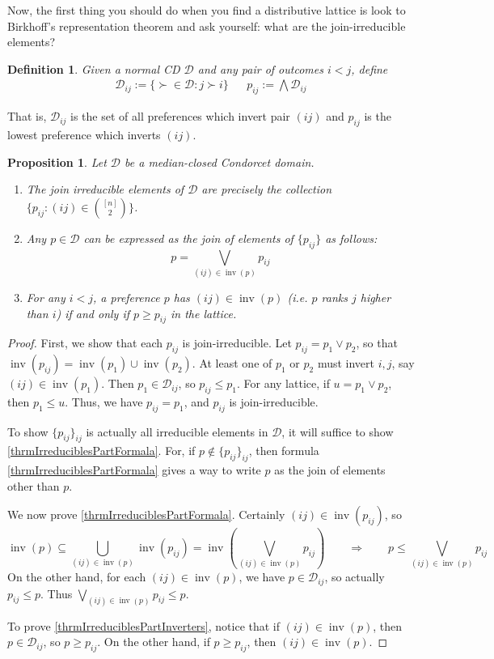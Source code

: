 \documentclass[12pt]{article}
\newtheorem{definition}[theorem]{Definition}
\newtheorem{proposition}[theorem]{Proposition}
\newcommand{\D}{\mathcal{D}}
\DeclareMathOperator*{\inv}{inv}
\newcommand{\1}[1]{\mathds{1}[{#1}]}
\begin{document}
  Now, the first thing you should do when you find a distributive lattice is 
  look to Birkhoff's representation theorem and ask yourself:
  what are the join-irreducible elements?

  \begin{definition}
    Given a normal CD $\D$ and any pair of outcomes $i<j$, define
    \begin{align*}
      \D_{ij} := \{ \succ\in\D : j\succ i \} &&
      p_{ij} := \bigwedge \D_{ij}
    \end{align*}
  \end{definition}
  That is, $\D_{ij}$ is the set of all preferences which invert pair $(ij)$
  and $p_{ij}$ is the lowest preference which inverts $(ij)$.
  \begin{proposition}\label{thrmIrreducibles}
    Let $\D$ be a median-closed Condorcet domain.
    \begin{enumerate}
      \item The join irreducible elements of $\D$ are precisely the collection 
        $\{p_{ij} : (ij)\in {[n]\choose  2}\}$.
      \item \label{thrmIrreduciblesPartFormala}
        Any $p\in\D$ can be expressed as the join of elements of
        $\{p_{ij}\}$ as follows:
        \[ p = \bigvee_{(ij)\in\inv(p)} p_{ij} \]
      \item \label{thrmIrreduciblesPartInverters}
        For any $i<j$, a preference $p$ has $(ij)\in\inv(p)$ (i.e. $p$
        ranks $j$ higher than $i$) if and only if $p\ge p_{ij}$ in the lattice.
    \end{enumerate}
  \end{proposition}
  \begin{proof}
    First, we show that each $p_{ij}$ is join-irreducible. 
    Let $p_{ij} = p_1\vee p_2$, so that
    $\inv(p_{ij}) = \inv(p_1) \cup \inv(p_2)$.
    At least one of $p_1$ or $p_2$ must invert $i,j$,
    say $(ij)\in\inv(p_1)$.
    Then $p_1\in\D_{ij}$, so $p_{ij}\le p_1$.
    For any lattice, if $u = p_1\vee p_2$, then $p_1\le u$.
    Thus, we have $p_{ij}=p_1$, and $p_{ij}$ is join-irreducible.

    To show $\{p_{ij}\}_{ij}$ is actually all irreducible elements in $\D$, it
    will suffice to show \ref{thrmIrreduciblesPartFormala}.
    For, if $p\notin\{p_{ij}\}_{ij}$, then formula \ref{thrmIrreduciblesPartFormala}
    gives a way to write $p$ as the join of elements other than $p$.

    We now prove \ref{thrmIrreduciblesPartFormala}.
    Certainly $(ij)\in\inv(p_{ij})$, so
    \[ \inv(p) \subseteq \bigcup_{(ij)\in\inv(p)} \inv(p_{ij}) 
      = \inv\left(\bigvee_{(ij)\in\inv(p)} p_{ij} \right) 
      \qquad\Longrightarrow\qquad
      p \le \bigvee_{(ij)\in\inv(p)} p_{ij} \]
    On the other hand, for each $(ij)\in\inv(p)$, we have $p\in\D_{ij}$, so
    actually $p_{ij}\le p$. Thus $\bigvee_{(ij)\in\inv(p)} p_{ij}\le p$.

    To prove \ref{thrmIrreduciblesPartInverters}, notice
    that if $(ij)\in\inv(p)$, then $p\in\D_{ij}$, so $p\ge p_{ij}$.
    On the other hand, if $p\ge p_{ij}$, then $(ij)\in\inv(p)$.
  \end{proof}
\end{document}
